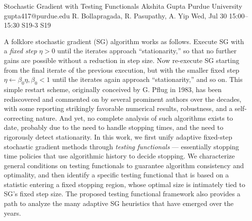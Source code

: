 \documentclass[12pt,lettersize,oneside]{book} %
\begin{document}
\begin{talk}
  {Stochastic Gradient with Testing Functionals}%
  {Akshita Gupta}%
  {Purdue University}%
  {gupta417@purdue.edu}%
  {R. Bollapragada, R. Pasupathy, A. Yip}%
  {}%
  {Wed, Jul 30 15:00--15:30}%
  {S19-3}%
  {S19}%
  
    
   
A folklore stochastic gradient (SG) algorithm works as follows. Execute SG with a \emph{fixed step} $\eta >0$ until the iterates approach ``stationarity,'' so that no further gains are possible without a reduction in step size. Now re-execute SG starting from the final iterate of the previous execution, but with the smaller fixed step  $\eta \leftarrow \beta_0\eta, \beta_0 <1$ until the iterates again approach ``stationarity,'' and so on. This simple restart scheme, originally conceived by G. Pflug in 1983, has been rediscovered and commented on by several prominent authors over the decades, with some reporting strikingly favorable numerical results, robustness, and a self-correcting nature. And yet, no complete analysis of such algorithms exists to date, probably due to the need to handle stopping times, and the need to rigorously detect stationarity. In this work, we first unify adaptive fixed-step stochastic gradient methods through \emph{testing functionals} --- essentially stopping time policies that use algorithmic history to decide stopping. We characterize general conditions on testing functionals to guarantee algorithm consistency and optimality, and then identify a specific testing functional that is based on a statistic entering a fixed stopping region, whose optimal size is intimately tied to SG's fixed step size. The proposed testing functional framework also provides a path to analyze the many adaptive SG heuristics that have emerged over the years.

\medskip




\end{talk}
\end{document}
